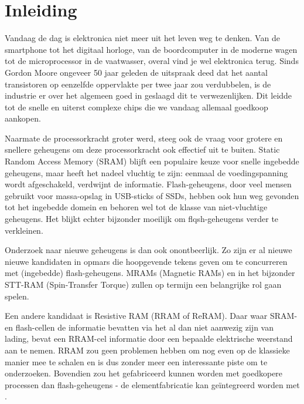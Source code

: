 \chapter{Inleiding}
\label{inleiding}

Vandaag de dag is elektronica niet meer uit het leven weg te denken. Van de smartphone tot het digitaal horloge, van de boordcomputer in de moderne wagen tot de microprocessor in de vaatwasser, overal vind je wel elektronica terug.
Sinds Gordon Moore ongeveer 50 jaar geleden de uitspraak deed dat het aantal transistoren op eenzelfde oppervlakte per twee jaar zou verdubbelen, is de industrie er over het algemeen goed in geslaagd dit te verwezenlijken. Dit leidde tot de snelle en uiterst complexe chips die we vandaag allemaal goedkoop aankopen.

Naarmate de processorkracht groter werd, steeg ook de vraag voor grotere en snellere geheugens om deze processorkracht ook effectief uit te buiten. Static Random Access Memory (SRAM) blijft een populaire keuze voor snelle ingebedde geheugens, maar heeft het nadeel vluchtig te zijn: eenmaal de voedingspanning wordt afgeschakeld, verdwijnt de informatie. Flash-geheugens, door veel mensen gebruikt voor massa-opslag in USB-sticks of SSDs, hebben ook hun weg gevonden tot het ingebedde domein en behoren wel tot de klasse van niet-vluchtige geheugens.
Het blijkt echter bijzonder moeilijk om flqsh-geheugens verder te verkleinen.

Onderzoek naar nieuwe geheugens is dan ook onontbeerlijk. Zo zijn er al nieuwe nieuwe kandidaten in opmars die hoopgevende tekens geven om te concurreren met (ingebedde) flash-geheugens. MRAMs (Magnetic RAMs) en in het bijzonder STT-RAM (Spin-Transfer Torque) zullen op termijn een belangrijke rol gaan spelen.

Een andere kandidaat is Resistive RAM (RRAM of ReRAM). Daar waar SRAM- en flash-cellen de informatie bevatten via het al dan niet aanwezig zijn van lading, bevat een RRAM-cel informatie door een bepaalde elektrische weerstand aan te nemen. RRAM zou geen problemen hebben om nog even op de klassieke manier mee te schalen en is dus zonder meer een interessante piste om te onderzoeken. Bovendien zou het gefabriceerd kunnen worden met goedkopere processen dan flash-geheugens - de elementfabricatie kan geïntegreerd worden met .

